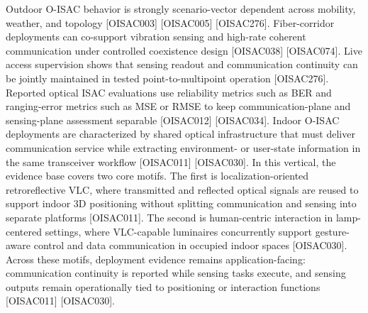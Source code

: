 {}\markdownRendererInterblockSeparator
{}\markdownRendererUlBeginTight
\markdownRendererUlItem Outdoor O-ISAC behavior is strongly scenario-vector dependent across mobility, weather, and topology [O\markdownRendererUnderscore{}ISAC\markdownRendererUnderscore{}003] [O\markdownRendererUnderscore{}ISAC\markdownRendererUnderscore{}005] [O\markdownRendererUnderscore{}ISAC\markdownRendererUnderscore{}276].\markdownRendererUlItemEnd 
\markdownRendererUlItem Fiber-corridor deployments can co-support vibration sensing and high-rate coherent communication under controlled coexistence design [O\markdownRendererUnderscore{}ISAC\markdownRendererUnderscore{}038] [O\markdownRendererUnderscore{}ISAC\markdownRendererUnderscore{}074].\markdownRendererUlItemEnd 
\markdownRendererUlItem Live access supervision shows that sensing readout and communication continuity can be jointly maintained in tested point-to-multipoint operation [O\markdownRendererUnderscore{}ISAC\markdownRendererUnderscore{}276].\markdownRendererUlItemEnd 
\markdownRendererUlItem Reported optical ISAC evaluations use reliability metrics such as BER and ranging-error metrics such as MSE or RMSE to keep communication-plane and sensing-plane assessment separable [O\markdownRendererUnderscore{}ISAC\markdownRendererUnderscore{}012] [O\markdownRendererUnderscore{}ISAC\markdownRendererUnderscore{}034].\markdownRendererUlItemEnd 
\markdownRendererUlEndTight \markdownRendererInterblockSeparator
{}
\markdownRendererSectionEnd 
\markdownRendererSectionEnd \markdownRendererSectionBegin
{}\markdownRendererInterblockSeparator
{}\markdownRendererSectionBegin
{}\markdownRendererInterblockSeparator
{}Indoor O-ISAC deployments are characterized by shared optical infrastructure that must deliver communication service while extracting environment- or user-state information in the same transceiver workflow [O\markdownRendererUnderscore{}ISAC\markdownRendererUnderscore{}011] [O\markdownRendererUnderscore{}ISAC\markdownRendererUnderscore{}030]. In this vertical, the evidence base covers two core motifs. The first is localization-oriented retroreflective VLC, where transmitted and reflected optical signals are reused to support indoor 3D positioning without splitting communication and sensing into separate platforms [O\markdownRendererUnderscore{}ISAC\markdownRendererUnderscore{}011]. The second is human-centric interaction in lamp-centered settings, where VLC-capable luminaires concurrently support gesture-aware control and data communication in occupied indoor spaces [O\markdownRendererUnderscore{}ISAC\markdownRendererUnderscore{}030]. Across these motifs, deployment evidence remains application-facing: communication continuity is reported while sensing tasks execute, and sensing outputs remain operationally tied to positioning or interaction functions [O\markdownRendererUnderscore{}ISAC\markdownRendererUnderscore{}011] [O\markdownRendererUnderscore{}ISAC\markdownRendererUnderscore{}030].\markdownRendererInterblockSeparator
